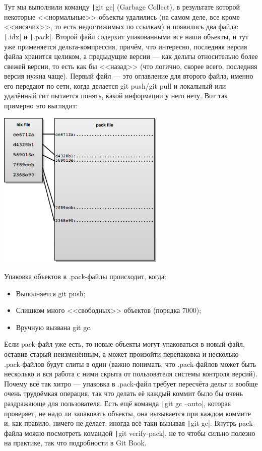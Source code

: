 \documentclass[a5paper]{article}
\begin{document}
Тут мы выполнили команду \texttt|git gc| (Garbage Collect), в результате которой некоторые <<нормальные>> объекты удалились (на самом деле, все кроме <<висячих>>, то есть недостижимых по ссылкам) и появилось два файла: \texttt|.idx| и \texttt|.pack|. Второй файл содерхит упакованными все наши объекты, и тут уже применяется дельта-компрессия, причём, что интересно, последняя версия файла хранится целиком, а предыдущие версии --- как дельты относительно более свежей версии, то есть как бы <<назад>> (что логично, скорее всего, последняя версия нужна чаще). Первый файл --- это оглавление для второго файла, именно его передают по сети, когда делается git push/git pull и локальный или удалённый гит пытается понять, какой информации у него нету. Вот так примерно это выглядит:

\begin{center}
    \includegraphics[width=0.6\textwidth]{gitPackFiles.png}
\end{center}

Упаковка объектов в .pack-файлы происходит, когда:
\begin{itemize}
    \item Выполняется git push;
    \item Слишком много <<свободных>> объектов (порядка 7000);
    \item Вручную вызвана git gc.
\end{itemize}

Если pack-файл уже есть, то новые объекты могут упаковаться в новый файл, оставив старый неизменённым, а может произойти перепаковка и несколько .pack-файлов будут слиты в один (важно понимать, что .pack-файлов может быть несколько и вся работа с ними скрыта от пользователя системы контроля версий). Почему всё так хитро --- упаковка в .pack-файл требует пересчёта дельт и вообще очень трудоёмкая операция, так что делать её каждый коммит было бы очень раздражающе для пользователя. Есть ещё команда \texttt|git gc --auto|, которая проверяет, не надо ли запаковать объекты, она вызывается при каждом коммите и, как правило, ничего не делает, иногда всё-таки вызывая \texttt|git gc|. Внутрь pack-файла можно посмотреть командой \texttt|git verify-pack|, не то чтобы сильно полезно на практике, так что подробности в Git Book.
\end{document}
